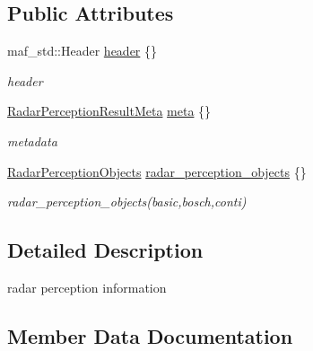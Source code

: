 \subsection*{Public Attributes}
\begin{DoxyCompactItemize}
\item 
maf\+\_\+std\+::\+Header \hyperlink{structmaf__perception__interface_1_1RadarPerceptionResult_a338cc92fb5fdcce368e3bf769158a0c1}{header} \{\}
\begin{DoxyCompactList}\small\item\em header \end{DoxyCompactList}\item 
\hyperlink{structmaf__perception__interface_1_1RadarPerceptionResultMeta}{Radar\+Perception\+Result\+Meta} \hyperlink{structmaf__perception__interface_1_1RadarPerceptionResult_a30bfa65b20eb5dced24e2852c4db6a57}{meta} \{\}
\begin{DoxyCompactList}\small\item\em metadata \end{DoxyCompactList}\item 
\hyperlink{structmaf__perception__interface_1_1RadarPerceptionObjects}{Radar\+Perception\+Objects} \hyperlink{structmaf__perception__interface_1_1RadarPerceptionResult_afd470c855ca0d40c46ef75f341128fd6}{radar\+\_\+perception\+\_\+objects} \{\}
\begin{DoxyCompactList}\small\item\em radar\+\_\+perception\+\_\+objects(basic,bosch,conti) \end{DoxyCompactList}\end{DoxyCompactItemize}


\subsection{Detailed Description}
radar perception information 

\subsection{Member Data Documentation}
\mbox{\label{structmaf__perception__interface_1_1RadarPerceptionResult_a338cc92fb5fdcce368e3bf769158a0c1}} 
